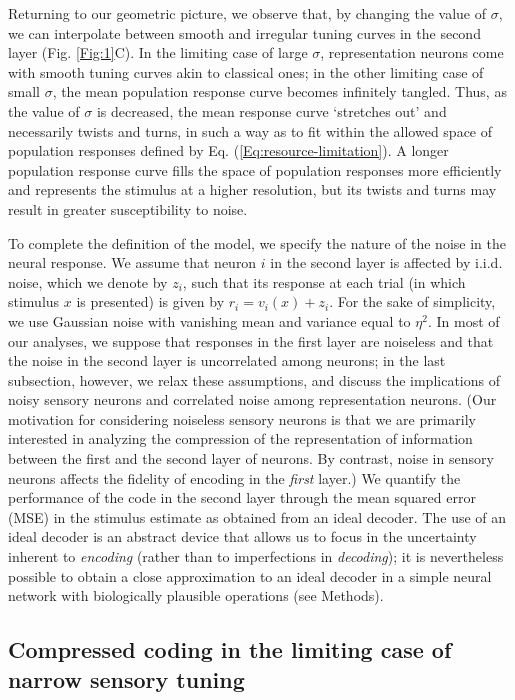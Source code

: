 \documentclass[a4paper]{article}%
\begin{document}
Returning to our geometric picture, we observe that, by changing the value of
$\sigma$, we can interpolate between smooth and irregular tuning curves in the
second layer (Fig. \ref{Fig:1}C). In the limiting case of large $\sigma$,
representation neurons come with smooth tuning curves akin to classical ones;
in the other limiting case of small $\sigma$, the mean population response
curve becomes infinitely tangled. Thus, as the value of $\sigma$ is decreased,
the mean response curve `stretches out' and necessarily twists and turns, in
such a way as to fit within the allowed space of population responses defined
by Eq. (\ref{Eq:resource-limitation}). A longer population response curve
fills the space of population responses more efficiently and represents the
stimulus at a higher resolution, but its twists and turns may result in
greater susceptibility to noise.

To complete the definition of the model, we specify the nature of the noise in
the neural response. We assume that neuron $i$ in the second layer is affected
by i.i.d. noise, which we denote by $z_{i}$, such that its response at each
trial (in which stimulus $x$ is presented) is given by $r_{i}=v_{i}\left(
x\right)  +z_{i}$. For the sake of simplicity, we use Gaussian noise with
vanishing mean and variance equal to $\eta^{2}$. In most of our analyses, we
suppose that responses in the first layer are noiseless and that the noise in
the second layer is uncorrelated among neurons; in the last subsection,
however, we relax these assumptions, and discuss the implications of noisy
sensory neurons and correlated noise among representation neurons. (Our
motivation for considering noiseless sensory neurons is that we are primarily
interested in analyzing the compression of the representation of information
between the first and the second layer of neurons. By contrast, noise in
sensory neurons affects the fidelity of encoding in the \textit{first} layer.)
We quantify the performance of the code in the second layer through the mean
squared error (MSE) in the stimulus estimate as obtained from an ideal
decoder. The use of an ideal decoder is an abstract device that allows us to
focus in the uncertainty inherent to \textit{encoding} (rather than to
imperfections in \textit{decoding}); it is nevertheless possible to obtain a
close approximation to an ideal decoder in a simple neural network with
biologically plausible operations (see Methods).

\subsection*{Compressed coding in the limiting case of narrow sensory tuning}
\end{document}
